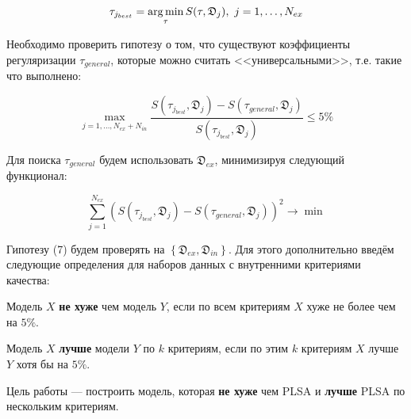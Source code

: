 \documentclass[12pt,twoside]{article}
\begin{document}
\begin{equation}
\tau_{j_{best}} = \argmin_{\tau} S(\tau, \mathfrak{D}_j) ,\ j = 1,\dots , N_{ex}
\end{equation}

Необходимо проверить гипотезу о том, что существуют коэффициенты регуляризации $\tau_{general}$, которые можно считать <<универсальными>>, т.е. такие что выполнено:

\begin{equation}
\max_{j=1,\dots,N_{ex}+N_{in}} \frac{S(\tau_{j_{best}}, \mathfrak{D}_j)- S(\tau_{general}, \mathfrak{D}_j)}{S(\tau_{j_{best}}, \mathfrak{D}_j)} \leq 5\%
\end{equation}

Для поиска $\tau_{general}$ будем использовать $\mathfrak{D}_{ex}$, минимизируя следующий функционал:

\begin{equation}
\sum_{j=1}^{N_{ex}} \left(S(\tau_{j_{best}}, \mathfrak{D}_j)- S(\tau_{general}, \mathfrak{D}_j)\right)^2 \to \min
\end{equation}

Гипотезу (7) будем проверять на $\left\{\mathfrak{D}_{ex}, \mathfrak{D}_{in}\right\}$. Для этого дополнительно введём следующие определения для наборов данных с внутренними критериями качества:

\begin{Def}
Модель $X$ {\bf не хуже} чем модель $Y$, если по всем критериям $X$ хуже не более чем на $5\%$.
\end{Def}

\begin{Def}
	Модель $X$ {\bf лучше} модели $Y$ по $k$ критериям, если по этим $k$ критериям $X$ лучше $Y$ хотя бы на $5\%$.
\end{Def}

Цель работы --- построить модель, которая {\bf не хуже} чем PLSA\cite{Hofmann:1999:PLS:2073796.2073829} и {\bf лучше} PLSA по нескольким критериям.


%
%
\end{document}
